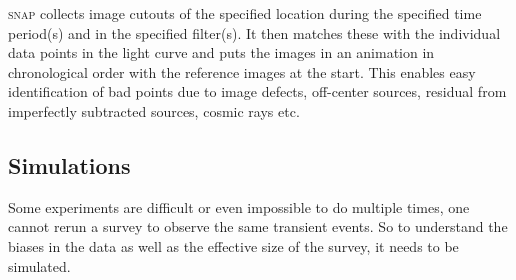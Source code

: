 \documentclass[a4paper,oneside,12pt, class=Latex/Classes/PhDthesisPSnPDF, crop=false]{standalone}
\begin{document}
\textsc{snap} collects image cutouts of the specified location during the  specified time period(s) and in the specified filter(s). It then matches these with the individual data points in the light curve and puts the images in an animation in chronological order with the reference images at the start. This enables easy identification of bad points due to image defects, off-center sources, residual from imperfectly subtracted sources, cosmic rays etc.

\subsection{Simulations}
Some experiments are difficult or even impossible to do multiple times, one cannot rerun a survey to observe the same transient events. So to understand the biases in the data as well as the effective size of the survey, it needs to be simulated.
\end{document}
